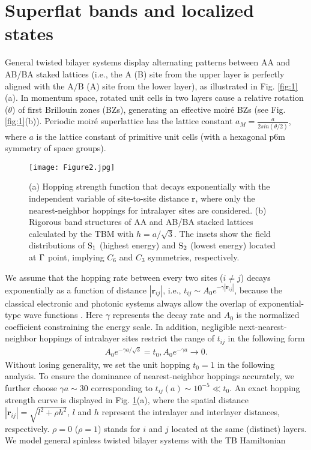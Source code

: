 \documentclass[%
reprint,
amsmath,amssymb,amsfonts
aps,
superscriptaddress,
prx
]{revtex4-1}
\begin{document}
\section{Superflat bands and localized states} 
General twisted bilayer systems display alternating patterns between AA and AB/BA staked lattices (i.e., the A (B) site from the upper layer is perfectly aligned with the A/B (A) site from the lower layer), as illustrated in Fig. \ref{fig:1}(a). In momentum space, rotated unit cells in two layers cause a relative rotation ($\theta$) of first Brillouin zones (BZs), generating an effective moir\'e BZs (see Fig. \ref{fig:1}(b)). 
Periodic moir\'e superlattice has the lattice constant $a_M=\frac{a}{2sin(\theta/2)}$, where $a$ is the lattice constant of primitive unit cells (with a hexagonal p6m symmetry of space groups). 
\begin{figure} 
\texttt{[image: Figure2.jpg]}%
\caption{(a) Hopping strength function that decays exponentially with the independent variable of site-to-site distance ${\bm r}$, where only the nearest-neighbor hoppings for intralayer sites are considered. 
(b) Rigorous band structures of AA and AB/BA stacked lattices calculated by the TBM with $h=a/\sqrt{3}$.
The insets show the field distributions of ${\rm S_1}$ (highest energy) and ${\rm S_2}$ (lowest energy) located at ${\rm \Gamma}$ point, implying $C_6$ and $C_3$ symmetries, respectively.} 
\label{fig:2}
\end{figure}%
We assume that the hopping rate between every two sites ($i\neq j$) decays exponentially as a function of distance $|{\bm r}_{ij}|$, i.e., $t_{ij}\sim A_0e^{-\gamma |{\bm r}_{ij}|}$, because the classical electronic and photonic systems always allow the overlap of exponential-type wave functions \cite{e1_hopping,e2_hopping,o1_hopping,o2_hopping}. Here $\gamma$ represents the decay rate and $A_0$ is the normalized coefficient constraining the energy scale. In addition, negligible next-nearest-neighbor hoppings of intralayer sites restrict the range of $t_{ij}$ in the following form 
\begin{equation}
\begin{split}
A_{0}e^{-\gamma a/\sqrt{3}}=t_0, A_{0}e^{-\gamma a}\to0. 
\end{split}
\label{eq:1}
\end{equation}
Without losing generality, we set the unit hopping $t_0=1$ in the following analysis. To ensure the dominance of nearest-neighbor hoppings accurately, we further choose $\gamma a\sim30$ corresponding to $t_{ij}(a)\sim10^{-5}\ll t_0$. An exact hopping strength curve is displayed in Fig. \ref{fig:2}(a), where the spatial distance $|{\bm r}_{ij}|=\sqrt{l^2+\rho h^2}$, $l$ and $h$ represent the intralayer and interlayer distances, respectively. $\rho=0$ ($\rho=1$) stands for $i$ and $j$ located at the same (distinct) layers. We model general spinless twisted bilayer systems with the TB Hamiltonian 
\end{document}

